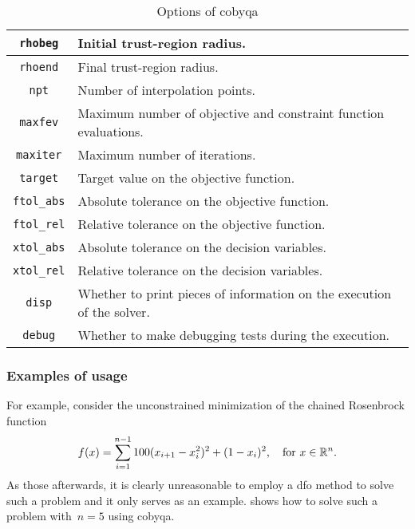 \begin{table}[ht]
    \caption{Options of \gls{cobyqa}}
    \label{tab:cobyqa-options}
    \centering
    \begin{tabularx}{\textwidth}{cX}
        \toprule
        \texttt{rhobeg}     & Initial trust-region radius.\\
        \midrule
        \texttt{rhoend}     & Final trust-region radius.\\
        \midrule
        \texttt{npt}        & Number of interpolation points.\\
        \midrule
        \texttt{maxfev}     & Maximum number of objective and constraint function evaluations.\\
        \midrule
        \texttt{maxiter}    & Maximum number of iterations.\\
        \midrule
        \texttt{target}     & Target value on the objective function.\\
        \midrule
        \texttt{ftol\_abs}  & Absolute tolerance on the objective function.\\
        \midrule
        \texttt{ftol\_rel}  & Relative tolerance on the objective function.\\
        \midrule
        \texttt{xtol\_abs}  & Absolute tolerance on the decision variables.\\
        \midrule
        \texttt{xtol\_rel}  & Relative tolerance on the decision variables.\\
        \midrule
        \texttt{disp}       & Whether to print pieces of information on the execution of the solver.\\
        \midrule
        \texttt{debug}      & Whether to make debugging tests during the execution.\\
        \bottomrule
    \end{tabularx}
\end{table}

\subsubsection{Examples of usage}

For example, consider the unconstrained minimization of the chained Rosenbrock function
\begin{equation*}
    f(x) = \sum_{i = 1}^{n - 1} 100(x_{i + 1} - x_i^2)^2 + (1 - x_i)^2, \quad \text{for~$x \in \mathbb{R}^n$.}
\end{equation*}
As those afterwards, it is clearly unreasonable to employ a \gls{dfo} method to solve such a problem and it only serves as an example.
 shows how to solve such a problem with~$n = 5$ using \gls{cobyqa}.

